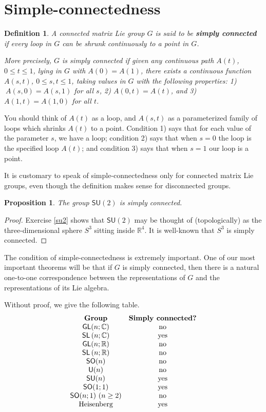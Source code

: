 \documentclass{amsbook}
\theoremstyle{plain}
\newtheorem{definition}[theorem]{Definition}
\newtheorem{proposition}[theorem]{Proposition}
\numberwithin{equation}{chapter}
\numberwithin{theorem}{chapter}
\begin{document}
\section{Simple-connectedness}

\begin{definition}
A connected matrix Lie group $G$ is said to be \textbf{simply connected} if
every loop in $G$ can be shrunk continuously to a point in $G$.

More precisely, $G$ is simply connected if given any continuous path $A(t)$,
$0\leq t\leq1$, lying in $G$ with $A(0)=A(1)$, there exists a continuous
function $A(s,t)$, $0\leq s,t\leq1$, taking values in $G$ with the following
properties: 1)$~A(s,0)=A(s,1)$ for all $s$, 2) $A(0,t)=A(t)$, and 3)
$A(1,t)=A(1,0)$ for all $t$.
\end{definition}

You should think of $A(t)$ as a loop, and $A(s,t)$ as a parameterized family
of loops which shrinks $A(t)$ to a point. Condition 1) says that for each
value of the parameter $s$, we have a loop; condition 2) says that when $s=0$
the loop is the specified loop $A(t)$; and condition 3) says that when $s=1$
our loop is a point.

It is customary to speak of simple-connectedness only for connected matrix Lie
groups, even though the definition makes sense for disconnected groups.

\begin{proposition}
\label{su2.sc}The group $\mathsf{SU}(2)$ is simply connected.
\end{proposition}

\begin{proof}
Exercise \ref{su2} shows that $\mathsf{SU}(2)$ may be thought of
(topologically) as the three-dimensional sphere $S^{3}$ sitting inside
$\mathbb{R}^{4}$. It is well-known that $S^{3}$ is simply connected.
\end{proof}

The condition of simple-connectedness is extremely important. One of our most
important theorems will be that if $G$ is simply connected, then there is a
natural one-to-one correspondence between the representations of $G$ and the
representations of its Lie algebra.

Without proof, we give the following table.
\[%
\begin{array}
[c]{cc}%
\text{\textbf{Group}} & \text{\textbf{Simply connected?}}\\
\mathsf{GL}(n;\mathbb{C}) & \text{no}\\
\mathsf{SL}\left(  n;\mathbb{C}\right)  & \text{yes}\\
\mathsf{GL}(n;\mathbb{R}) & \text{no}\\
\mathsf{SL}\left(  n;\mathbb{R}\right)  & \text{no}\\
\mathsf{SO}(n) & \text{no}\\
\mathsf{U}(n) & \text{no}\\
\mathsf{SU}(n) & \text{yes}\\
\mathsf{SO}(1;1) & \text{yes}\\
\mathsf{SO}(n;1)\text{ (}n\ge2\text{)} & \text{no}\\
\text{Heisenberg} & \text{yes}%
\end{array}
\]
\end{document}
